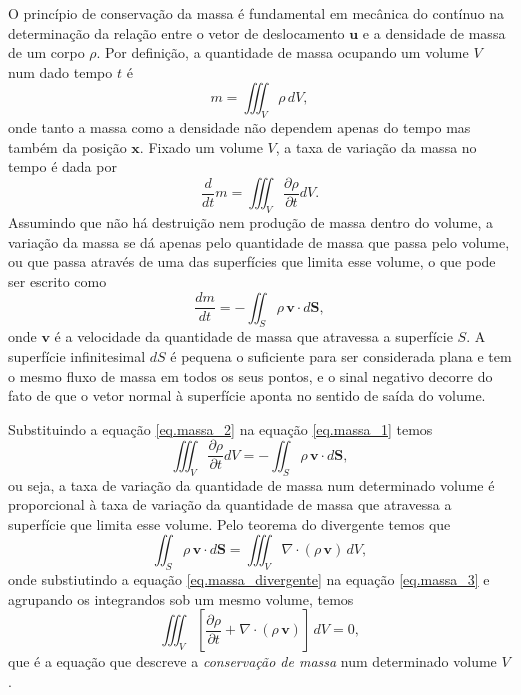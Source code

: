O princ\'ipio de conserva\c{c}\~ao da massa \'e fundamental em mec\^anica do cont\'inuo na determina\c{c}\~ao da rela\c{c}\~ao entre o vetor de deslocamento $\mathbf{u}$ e a densidade de massa de um corpo $\rho$. Por defini\c{c}\~ao, a quantidade de massa ocupando um volume $V$  num dado tempo $t$ \'e
\begin{equation*}
m=\iiint_V\rho\,dV,
\end{equation*}
onde tanto a massa como a densidade n\~ao dependem apenas do tempo mas tamb\'em da posi\c{c}\~ao $\mathbf{x}$. Fixado um volume $V$, a taxa de varia\c{c}\~ao da massa no tempo \'e dada por
\begin{equation}\label{eq.massa_1}
\frac{d}{dt}m=\iiint_V\frac{\partial\rho}{\partial t}dV.
\end{equation}
Assumindo que n\~ao h\'a destrui\c{c}\~ao nem produ\c{c}\~ao de massa dentro do volume, a varia\c{c}\~ao da massa se d\'a apenas pelo quantidade de massa que passa pelo volume, ou que passa atrav\'es de uma das superf\'icies que limita esse volume, o que pode ser escrito como
\begin{equation}\label{eq.massa_2}
\frac{dm}{dt}=-\iint_S\rho\,\mathbf{v}\cdot d\mathbf{S},
\end{equation}
onde $\mathbf{v}$ \'e a velocidade da quantidade de massa que atravessa a superf\'icie $S$. A superf\'icie infinitesimal $dS$ \'e pequena o suficiente para ser considerada plana e tem o mesmo fluxo de massa em todos os seus pontos, e o sinal negativo decorre do fato de que o vetor normal \`a superf\'icie aponta no sentido de sa\'ida do volume. 

Substituindo a equa\c{c}\~ao \ref{eq.massa_2} na equa\c{c}\~ao \ref{eq.massa_1} temos
\begin{equation}\label{eq.massa_3}
\iiint_V\frac{\partial\rho}{\partial t}dV=-\iint_S\rho\,\mathbf{v}\cdot d\mathbf{S},
\end{equation}
ou seja, a taxa de varia\c{c}\~ao da quantidade de massa num determinado volume \'e proporcional \`a taxa de varia\c{c}\~ao da quantidade de massa que atravessa a superf\'icie que limita esse volume. Pelo teorema do divergente temos que
\begin{equation}\label{eq.massa_divergente}
\iint_S\rho\,\mathbf{v}\cdot d\mathbf{S}=\iiint_V\nabla\cdot (\rho\,\mathbf{v})\,dV,
\end{equation}
onde substiutindo a equa\c{c}\~ao \ref{eq.massa_divergente} na equa\c{c}\~ao \ref{eq.massa_3} e agrupando os integrandos sob um mesmo volume, temos
\begin{equation*}
\iiint_V\left[\frac{\partial\rho}{\partial t}+\nabla\cdot (\rho\,\mathbf{v})\right]\,dV=0,
\end{equation*}
que \'e a equa\c{c}\~ao que descreve a \textit{conserva\c{c}\~ao de massa} num determinado volume $V$.

